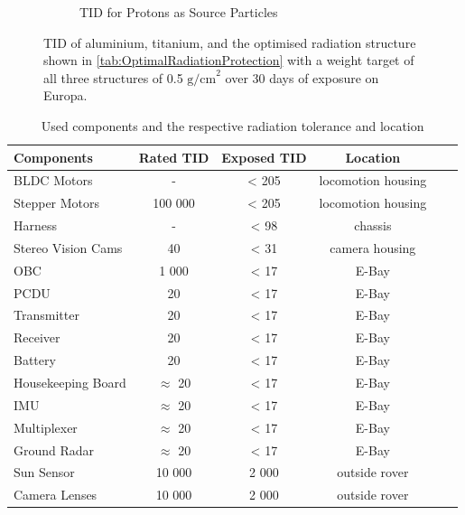 \begin{figure}[htb]
\begin{subfigure}[b]{0.49\textwidth}
         \caption{TID for Protons as Source Particles}
         \label{fig:TIDProtonShielding}
     \end{subfigure}
     \caption{TID of aluminium, titanium, and the optimised radiation structure shown in \autoref{tab:OptimalRadiationProtection} with a weight target of all three structures of 0.5 \(\text{g/cm}^2\) over 30 days of exposure on Europa.}
     \label{fig:AluminiumTitanOptimised}
\end{figure}

\begin{table}[htb]
\centering
\caption{Used components and the respective radiation tolerance and location}
\begin{adjustbox}{max width=\textwidth}
\begin{tabular}[l]{lccccc}

	\toprule
		Components	&	Rated TID	&	Exposed TID	&	Location\\
	\midrule
	
	BLDC Motors	&	-	&	< 205	&	locomotion housing\\	
	
	Stepper Motors	&	100 000	&	< 205	&	locomotion housing\\
	
	Harness	&	-	&	< 98	&	chassis\\	
	
	Stereo Vision Cams	&	40	&	< 31	&	camera housing\\	
	
	OBC	&	1 000	&	< 17	&	E-Bay\\
	
	PCDU	&	20	&	< 17	&	E-Bay\\
	
	Transmitter	&	20	&	< 17	&	E-Bay\\
	
	Receiver	&	20	&	< 17	&	E-Bay\\
	
	Battery	&	20	&	< 17	&	E-Bay\\
	
	Housekeeping Board	&	\(\approx\) 20	&	< 17	&	E-Bay\\
	
	IMU	&	\(\approx\) 20	&	< 17	&	E-Bay\\
	
	Multiplexer	&	\(\approx\) 20	&	< 17	&	E-Bay\\
	
	Ground Radar	&	\(\approx\) 20	&	< 17	&	E-Bay\\
	
	Sun Sensor	&	10 000	&	2 000	&	outside rover\\
	
	Camera Lenses	&	10 000	&	2 000	&	outside rover\\

	\bottomrule

\end{tabular}
\end{adjustbox}
\label{tab:RadiationList}
\end{table}

